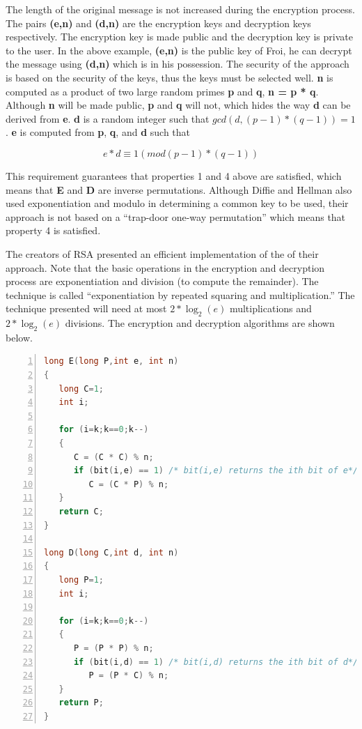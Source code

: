 \documentclass{article}
\begin{document}
The length of the original message is not increased during the encryption
process. The pairs \textbf{(e,n)} and \textbf{(d,n)} are the encryption
keys and decryption keys respectively. The encryption key is made
public and the decryption key is private to the user. In the above
example, \textbf{(e,n)} is the public key of Froi, he can decrypt
the message using \textbf{(d,n)} which is in his possession. The security
of the approach is based on the security of the keys, thus the keys
must be selected well. \textbf{n} is computed as a product of two
large random primes \textbf{p} and \textbf{q}, \textbf{n = p {*} q}.
Although \textbf{n} will be made public, \textbf{p} and \textbf{q}
will not, which hides the way \textbf{d} can be derived from \textbf{e}.
\textbf{d} is a random integer such that $gcd(d,(p-1)*(q-1))=1$.
\textbf{e} is computed from \textbf{p}, \textbf{q}, and \textbf{d}
such that

\[
e*d\equiv1(mod(p-1)*(q-1))
\]


This requirement guarantees that properties 1 and 4 above are satisfied,
which means that \textbf{E} and \textbf{D} are inverse permutations.
Although Diffie and Hellman\cite{diffie_new_1976} also used exponentiation
and modulo in determining a common key to be used, their approach
is not based on a ``trap-door one-way permutation'' which means
that property 4 is satisfied.

The creators of RSA presented an efficient implementation of the of
their approach. Note that the basic operations in the encryption and
decryption process are exponentiation and division (to compute the
remainder). The technique is called ``exponentiation by repeated
squaring and multiplication.'' The technique presented will need
at most $2*\log_{2}(e)$ multiplications and $2*\log_{2}(e)$ divisions.
The encryption and decryption algorithms are shown below.
\begin{lstlisting}[language=C,numbers=left]
long E(long P,int e, int n)
{
   long C=1;
   int i;
   
   for (i=k;k==0;k--)
   {
      C = (C * C) % n;
      if (bit(i,e) == 1) /* bit(i,e) returns the ith bit of e*/
         C = (C * P) % n;
   }
   return C;  
}

long D(long C,int d, int n)
{
   long P=1;
   int i;
   
   for (i=k;k==0;k--)
   {
      P = (P * P) % n;
      if (bit(i,d) == 1) /* bit(i,d) returns the ith bit of d*/
         P = (P * C) % n;
   }
   return P;  
}
\end{lstlisting}
\end{document}
